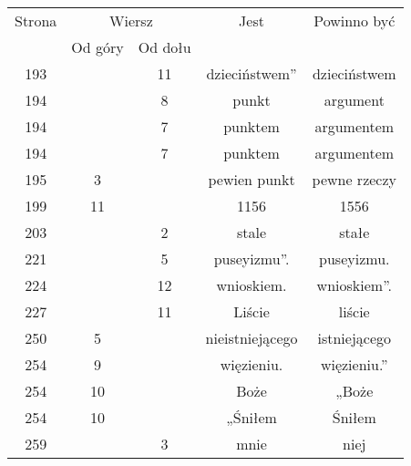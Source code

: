 \documentclass[a4paper,11pt]{article}
\numberwithin{equation}{section}
\begin{document}
\begin{center}
  \newpage

  \begin{tabular}{|c|c|c|c|c|}
    \hline
    Strona & \multicolumn{2}{c|}{Wiersz} & Jest
                              & Powinno być \\ \cline{2-3}
    & Od góry & Od dołu & & \\
    \hline
    193 & & 11 & dzieciństwem” & dzieciństwem \\
    194 & & \hphantom{0}8 & punkt & argument \\
    194 & & \hphantom{0}7 & punktem & argumentem \\
    194 & & \hphantom{0}7 & punktem & argumentem \\
    195 & \hphantom{0}3 & & pewien punkt & pewne rzeczy \\
    199 & 11 & & 1156 & 1556 \\
    203 & & \hphantom{0}2 & stale & stałe \\
    221 & & \hphantom{0}5 & puseyizmu”. & puseyizmu. \\
    224 & & 12 & wnioskiem. & wnioskiem”. \\
    227 & & 11 & Liście & liście \\
    250 & \hphantom{0}5 & & nieistniejącego & istniejącego \\
    254 & \hphantom{0}9 & & więzieniu. & więzieniu.” \\
    254 & 10 & & Boże & „Boże \\
    254 & 10 & & „Śniłem & Śniłem \\
    259 & & \hphantom{0}3 & mnie & niej \\
    \hline
  \end{tabular}

\end{center}

\VerSpaceTwo
\end{document}
